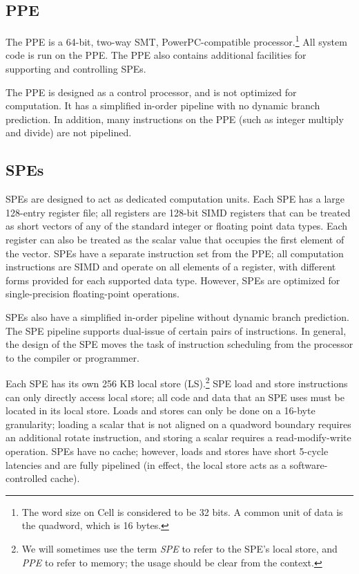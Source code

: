 \subsection{PPE}

The PPE is a 64-bit, two-way SMT, PowerPC-compatible processor.\footnote{The word size on Cell is considered to be 32 bits. A common unit of data is the quadword, which is 16 bytes.} All system code is run on the PPE. The PPE also contains additional facilities for supporting and controlling SPEs.

The PPE is designed as a control processor, and is not optimized for computation. It has a simplified in-order pipeline with no dynamic branch prediction. In addition, many instructions on the PPE (such as integer multiply and divide) are not pipelined.

\subsection{SPEs}

SPEs are designed to act as dedicated computation units. Each SPE has a large 128-entry register file; all registers are 128-bit SIMD registers that can be treated as short vectors of any of the standard integer or floating point data types. Each register can also be treated as the scalar value that occupies the first element of the vector. SPEs have a separate instruction set from the PPE; all computation instructions are SIMD and operate on all elements of a register, with different forms provided for each supported data type. However, SPEs are optimized for single-precision floating-point operations.

SPEs also have a simplified in-order pipeline without dynamic branch prediction. The SPE pipeline supports dual-issue of certain pairs of instructions. In general, the design of the SPE moves the task of instruction scheduling from the processor to the compiler or programmer.

Each SPE has its own 256 KB local store (LS).\footnote{We will sometimes use the term \emph{SPE} to refer to the SPE's local store, and \emph{PPE} to refer to memory; the usage should be clear from the context.} SPE load and store instructions can only directly access local store; all code and data that an SPE uses must be located in its local store. Loads and stores can only be done on a 16-byte granularity; loading a scalar that is not aligned on a quadword boundary requires an additional rotate instruction, and storing a scalar requires a read-modify-write operation. SPEs have no cache; however, loads and stores have short 5-cycle latencies and are fully pipelined (in effect, the local store acts as a software-controlled cache).


